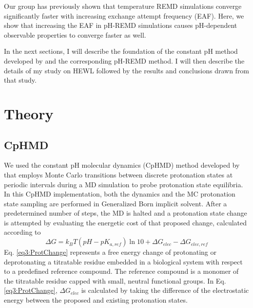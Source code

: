 Our group has previously shown that temperature REMD simulations converge
significantly faster with increasing exchange attempt frequency (EAF).
\cite{Sindhikara2008,Sindhikara2010}  Here, we show that increasing the EAF in
pH-REMD simulations causes pH-dependent observable properties to converge faster
as well.

In the next sections, I will describe the foundation of the constant pH method
developed by \citeauthor{Mongan2004} \cite{Mongan2004} and the corresponding
pH-REMD method. \cite{Itoh2011,Wallace2011} I will then describe the details of
my study on HEWL followed by the results and conclusions drawn from that study.

\section{Theory}

\subsection{CpHMD}

We used the constant pH molecular dynamics (CpHMD) method developed by
\citeauthor{Mongan2004} \cite{Mongan2004} that employs Monte Carlo transitions
between discrete protonation states at periodic intervals during a MD simulation
to probe protonation state equilibria.  In this CpHMD implementation, both the
dynamics and the MC protonation state sampling are performed in Generalized Born
implicit solvent.  After a predetermined number of steps, the MD is halted and a
protonation state change is attempted by evaluating the energetic cost of that
proposed change, calculated according to \cite{Mongan2004}
\begin{equation}
   \Delta G = k _ B T \left( pH - pK _ {a,ref} \right) \ln 10 + \Delta G _
         {elec} - \Delta G _ {elec,ref}
   \label{eq3:ProtChange}
\end{equation}
Eq. \ref{eq3:ProtChange} represents a free energy change of protonating or
deprotonating a titratable residue embedded in a biological system with respect
to a predefined reference compound.  The reference compound is a monomer of the
titratable residue capped with small, neutral functional groups.  In Eq.
\ref{eq3:ProtChange}, $\Delta G _ {elec}$ is calculated by taking the difference
of the electrostatic energy between the proposed and existing protonation
states. \cite{Mongan2004}

